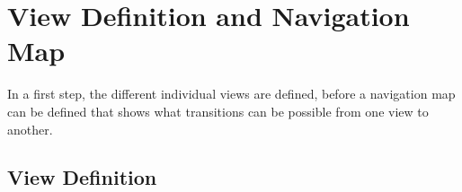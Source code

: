 
\section{View Definition and Navigation Map}


In a first step, the different individual views are defined, before a navigation map can be defined that shows what transitions can be possible from one view to another.



\subsection{View Definition}

